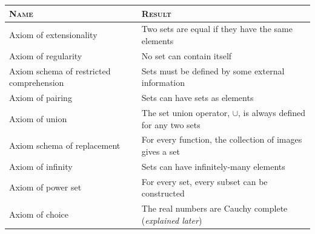 \documentclass[letterpaper,twoside]{article}
\begin{document}
\begin{table}[H]
    \centering
    \begin{doublespace}
        \setlength\tabcolsep{0pt}
        \begin{tabular*}{0.9\linewidth}{@{\extracolsep{\fill}} ll}
            \textsc{Name} & \textsc{Result} \\
            \hline
            Axiom of extensionality                  & Two sets are equal if they have the same elements \\
            Axiom of regularity                      & No set can contain itself \\
            Axiom schema of restricted comprehension & Sets must be defined by some external information \\
            Axiom of pairing                         & Sets can have sets as elements \\
            Axiom of union                           & The set union operator, $\cup$, is always defined for any two sets \\
            Axiom schema of replacement              & For every function, the collection of images gives a set \\
            Axiom of infinity                        & Sets can have infinitely-many elements \\
            Axiom of power set                       & For every set, every subset can be constructed \\
            Axiom of choice                          & The real numbers are Cauchy complete (\textit{explained later})\\
        \end{tabular*}
    \end{doublespace}
    \normalsize
\end{table}
\end{document}
